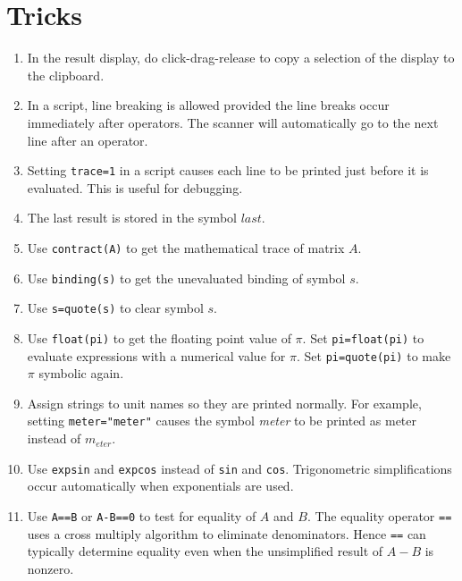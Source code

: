 \section{Tricks}
\begin{enumerate}

\item
In the result display, do click-drag-release to copy a selection of the display to the clipboard.

\item
In a script, line breaking is allowed provided the line breaks occur immediately after operators.
The scanner will automatically go to the next line after an operator.

\item
Setting \verb$trace=1$ in a script causes each line to be printed just before it is evaluated.
This is useful for debugging.

\item
The last result is stored in the symbol $last$.

\item
Use \verb$contract(A)$ to get the mathematical trace of matrix $A$.

\item
Use \verb$binding(s)$ to get the unevaluated binding of symbol $s$.

\item
Use \verb$s=quote(s)$ to clear symbol $s$.

\item
Use \verb$float(pi)$ to get the floating point value of $\pi$.
Set \verb$pi=float(pi)$ to evaluate expressions with a numerical value for $\pi$.
Set \verb$pi=quote(pi)$ to make $\pi$ symbolic again.

\item
Assign strings to unit names so they are printed normally.
For example, setting \verb$meter="meter"$ causes the symbol {\it meter}
to be printed as meter instead of $m_{eter}$.

\item
Use \verb$expsin$ and \verb$expcos$ instead of \verb$sin$ and \verb$cos$.
Trigonometric simplifications occur automatically when exponentials are used.

\item
Use \verb$A==B$ or \verb$A-B==0$ to test for equality of $A$ and $B$.
The equality operator \verb$==$ uses a cross multiply algorithm to eliminate denominators.
Hence \verb$==$ can typically determine equality even when the unsimplified result of $A-B$ is nonzero.


\end{enumerate}
